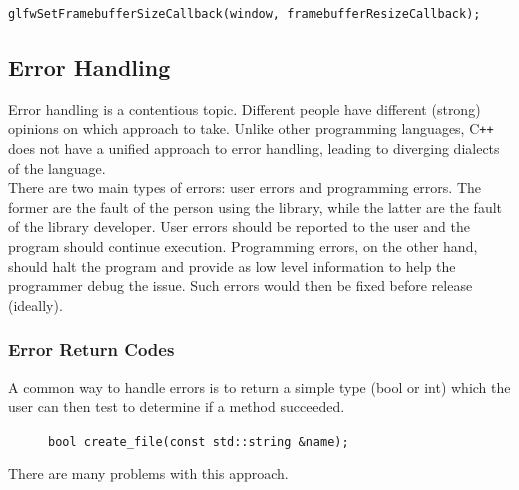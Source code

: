 \documentclass[12pt]{report}
\newcommand{\cpp}{C\texttt{++}}
\theoremstyle{definition}
\begin{document}
        \begin{centering}
          \begin{Verbatim}[fontsize=\small]
glfwSetFramebufferSizeCallback(window, framebufferResizeCallback);
          \end{Verbatim}
        \end{centering}

      \subsection{Error Handling}

        Error handling is a contentious topic. Different people have different
        (strong) opinions on which approach to take. Unlike other programming
        languages, \cpp{} does not have a unified approach to error handling,
        leading to diverging dialects of the language. \\

        There are two main types of errors: user errors and programming errors.
        The former are the fault of the person using the library, while the
        latter are the fault of the library developer. User errors should be
        reported to the user and the program should continue execution.
        Programming errors, on the other hand, should halt the program and
        provide as low level information to help the programmer debug the
        issue. Such errors would then be fixed before release (ideally). \\

        \subsubsection{Error Return Codes}

          A common way to handle errors is to return a simple type (bool or int)
          which the user can then test to determine if a method succeeded.

          \begin{figure}[h]
            \centering
            \verb|bool create_file(const std::string &name);|
          \end{figure}

          There are many problems with this approach.
\end{document}
